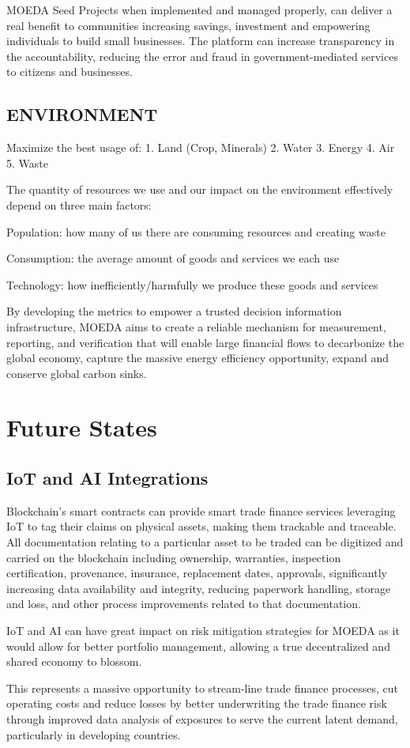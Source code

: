 \documentclass{article}
\begin{document}
MOEDA Seed Projects when implemented and managed properly,  can deliver a real benefit to communities increasing savings, investment and empowering individuals to build small businesses. The platform can increase transparency in the accountability, reducing the error and fraud in government-mediated services to citizens and businesses. 


\subsection {ENVIRONMENT}

Maximize the best usage of:
1.	Land (Crop, Minerals) 
2.	Water
3.	Energy
4.	Air
5.	Waste

The quantity of resources we use and our impact on the environment effectively depend on three main factors:

Population: how many of us there are consuming resources and creating waste 

Consumption: the average amount of goods and services we each use 

Technology: how inefficiently/harmfully we produce these goods and services 

By developing the metrics to empower a trusted decision information infrastructure, MOEDA aims to create a reliable mechanism for measurement, reporting, and verification that will enable large financial flows to decarbonize the global economy, capture the massive energy efficiency opportunity, expand and conserve global carbon sinks.

\section {Future States}

\subsection {IoT and AI Integrations}

Blockchain’s smart contracts can provide smart trade finance services leveraging IoT to tag their claims on physical assets, making them trackable and traceable. All documentation relating to a particular asset to be traded can be digitized and carried on the blockchain  including ownership, warranties, inspection certification, provenance, insurance, replacement dates, approvals, significantly increasing data availability and integrity, reducing paperwork handling, storage and loss, and other process improvements related to that documentation. 

IoT and AI can have great impact on risk mitigation strategies for MOEDA as it would allow for better portfolio management, allowing a true decentralized and shared economy to blossom.

This represents a massive opportunity to stream-line trade finance processes, cut operating costs and reduce losses by better underwriting the trade finance risk through improved data analysis of exposures to serve the current latent demand, particularly in developing countries. 
\end{document}
